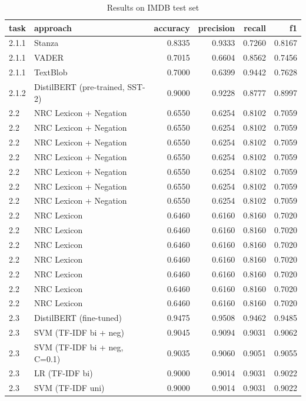 \begin{table}
\caption{Results on IMDB test set}
\label{tab:results}
\begin{tabular}{llrrrr}
\toprule
task & approach & accuracy & precision & recall & f1 \\
\midrule
2.1.1 & Stanza & 0.8335 & 0.9333 & 0.7260 & 0.8167 \\
2.1.1 & VADER & 0.7015 & 0.6604 & 0.8562 & 0.7456 \\
2.1.1 & TextBlob & 0.7000 & 0.6399 & 0.9442 & 0.7628 \\
2.1.2 & DistilBERT (pre-trained, SST-2) & 0.9000 & 0.9228 & 0.8777 & 0.8997 \\
2.2 & NRC Lexicon + Negation & 0.6550 & 0.6254 & 0.8102 & 0.7059 \\
2.2 & NRC Lexicon + Negation & 0.6550 & 0.6254 & 0.8102 & 0.7059 \\
2.2 & NRC Lexicon + Negation & 0.6550 & 0.6254 & 0.8102 & 0.7059 \\
2.2 & NRC Lexicon + Negation & 0.6550 & 0.6254 & 0.8102 & 0.7059 \\
2.2 & NRC Lexicon + Negation & 0.6550 & 0.6254 & 0.8102 & 0.7059 \\
2.2 & NRC Lexicon + Negation & 0.6550 & 0.6254 & 0.8102 & 0.7059 \\
2.2 & NRC Lexicon + Negation & 0.6550 & 0.6254 & 0.8102 & 0.7059 \\
2.2 & NRC Lexicon & 0.6460 & 0.6160 & 0.8160 & 0.7020 \\
2.2 & NRC Lexicon & 0.6460 & 0.6160 & 0.8160 & 0.7020 \\
2.2 & NRC Lexicon & 0.6460 & 0.6160 & 0.8160 & 0.7020 \\
2.2 & NRC Lexicon & 0.6460 & 0.6160 & 0.8160 & 0.7020 \\
2.2 & NRC Lexicon & 0.6460 & 0.6160 & 0.8160 & 0.7020 \\
2.2 & NRC Lexicon & 0.6460 & 0.6160 & 0.8160 & 0.7020 \\
2.2 & NRC Lexicon & 0.6460 & 0.6160 & 0.8160 & 0.7020 \\
2.3 & DistilBERT (fine-tuned) & 0.9475 & 0.9508 & 0.9462 & 0.9485 \\
2.3 & SVM (TF-IDF bi + neg) & 0.9045 & 0.9094 & 0.9031 & 0.9062 \\
2.3 & SVM (TF-IDF bi + neg, C=0.1) & 0.9035 & 0.9060 & 0.9051 & 0.9055 \\
2.3 & LR (TF-IDF bi) & 0.9000 & 0.9014 & 0.9031 & 0.9022 \\
2.3 & SVM (TF-IDF uni) & 0.9000 & 0.9014 & 0.9031 & 0.9022 \\

\end{tabular}
\end{table}
